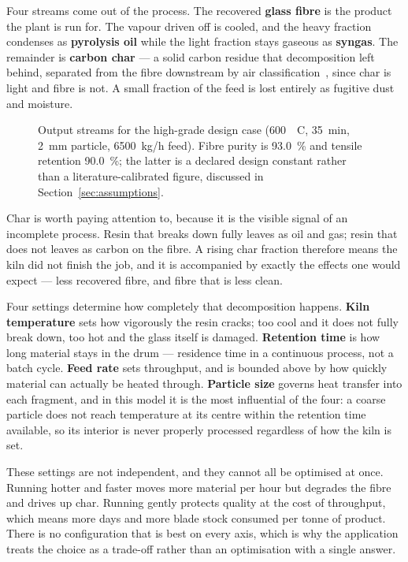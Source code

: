 Four streams come out of the process. The recovered \textbf{glass fibre} is the product the plant is run for. The vapour driven off is cooled, and the heavy fraction condenses as \textbf{pyrolysis oil} while the light fraction stays gaseous as \textbf{syngas}. The remainder is \textbf{carbon char} --- a solid carbon residue that decomposition left behind, separated from the fibre downstream by air classification~\cite{bladegas}, since char is light and fibre is not. A small fraction of the feed is lost entirely as fugitive dust and moisture.

\begin{figure}[htbp]
  \centering
  \resizebox{\textwidth}{!}{}
  \caption{Output streams for the high-grade design case
           (\SI{600}{\textdegree C}, \SI{35}{min}, \SI{2}{mm} particle,
           \SI{6500}{kg/h} feed). Fibre purity is \SI{93.0}{\%} and tensile
           retention \SI{90.0}{\%}; the latter is a declared design constant
           rather than a literature-calibrated figure, discussed in
           Section~\ref{sec:assumptions}.}
  \label{fig:massbalance}
\end{figure}

Char is worth paying attention to, because it is the visible signal of an
incomplete process. Resin that breaks down fully leaves as oil and gas; resin that does not leaves as carbon on the fibre. A rising char fraction therefore means the kiln did not finish the job, and it is accompanied by exactly the effects one would expect --- less recovered fibre, and fibre that is less clean.

Four settings determine how completely that decomposition happens.
\textbf{Kiln temperature} sets how vigorously the resin cracks; too cool and it does not fully break down, too hot and the glass itself is damaged.
\textbf{Retention time} is how long material stays in the drum --- residence time in a continuous process, not a batch cycle. 
\textbf{Feed rate} sets throughput, and is bounded above by how quickly material can actually be heated through. 
\textbf{Particle size} governs heat transfer into each fragment, and in this model it is the most influential of the four: a coarse
particle does not reach temperature at its centre within the retention time available, so its interior is never properly processed regardless of how the kiln is set.

These settings are not independent, and they cannot all be optimised at once. Running hotter and faster moves more material per hour but degrades the fibre and drives up char. Running gently protects quality at the cost of throughput, which means more days and more blade stock consumed per tonne of product. There is no configuration that is best on every axis, which is why the application treats the choice as a trade-off rather than an optimisation with a single answer.

